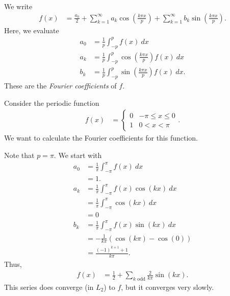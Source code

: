 \documentclass[10pt]{mypackage}
\begin{document}
\begin{example}
  We write
  \begin{align*}
    f(x) &= \frac{a_0}{2} + \sum_{k=1}^{\infty}a_k\cos\left( \frac{k\pi x}{p} \right) + \sum_{k=1}^{\infty}b_k\sin\left( \frac{k\pi x}{p} \right).
  \end{align*}
  Here, we evaluate
  \begin{align*}
    a_0 &= \frac{1}{p}\int_{-p}^{p} f(x)\:dx\\
    a_k &= \frac{1}{p}\int_{-p}^{p} \cos\left( \frac{k\pi x}{p} \right)f(x)\:dx\\
    b_k &= \frac{1}{p}\int_{-p}^{p} \sin\left( \frac{k\pi x}{p} \right)f(x)\:dx.
  \end{align*}
  These are the \textit{Fourier coefficients} of $f$.
\end{example}
\begin{example}
  Consider the periodic function
  \begin{align*}
    f(x) &= \begin{cases}
      0 & -\pi \leq x \leq 0\\
      1 & 0 < x < \pi
    \end{cases}.
  \end{align*}
  We want to calculate the Fourier coefficients for this function.\newline

  Note that $p = \pi$. We start with
  \begin{align*}
    a_0 &= \frac{1}{\pi}\int_{-\pi}^{\pi} f(x)\:dx\\
        &= 1.\\
    a_{k} &= \frac{1}{\pi}\int_{-\pi}^{\pi} f(x)\cos\left( kx \right)\:dx\\
          &= \frac{1}{\pi} \int_{-\pi}^{\pi} \cos\left( kx \right)\:dx\\
          &= 0\\
    b_k &= \frac{1}{\pi}\int_{-\pi}^{\pi} f(x)\sin\left( kx \right)\:dx\\
        &= -\frac{1}{k\pi}\left( \cos\left( k\pi \right) - \cos\left( 0 \right) \right) \\
        &= \frac{\left( -1 \right)^{k+1} + 1}{k\pi}.
  \end{align*}
  Thus, 
  \begin{align*}
    f(x) &= \frac{1}{2} + \sum_{k\text{ odd}} \frac{2}{k\pi}\sin\left( kx \right).
  \end{align*}
  This series does converge (in $L_2$) to $f$, but it converges very slowly.
\end{example}
\end{document}
